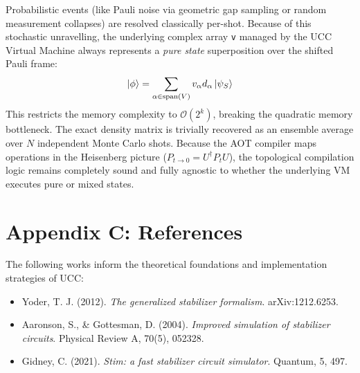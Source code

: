 \documentclass[11pt]{article}
\begin{document}
Probabilistic events (like Pauli noise via geometric gap sampling or random measurement collapses) are resolved classically per-shot. Because of this stochastic unravelling, the underlying complex array \texttt{v} managed by the UCC Virtual Machine always represents a \textit{pure state} superposition over the shifted Pauli frame:
\begin{equation}
    \ket{\phi} = \sum_{\alpha \in \text{span}(V)} v_\alpha d_\alpha \ket{\psi_S}
\end{equation}
This restricts the memory complexity to $\mathcal{O}(2^k)$, breaking the quadratic memory bottleneck. The exact density matrix is trivially recovered as an ensemble average over $N$ independent Monte Carlo shots. Because the AOT compiler maps operations in the Heisenberg picture ($P_{t \to 0} = U^\dagger P_t U$), the topological compilation logic remains completely sound and fully agnostic to whether the underlying VM executes pure or mixed states.

\newpage
\section{Appendix C: References}
\label{app:references}

The following works inform the theoretical foundations and implementation strategies of UCC:

\begin{itemize}
    \item Yoder, T. J. (2012). \textit{The generalized stabilizer formalism}. arXiv:1212.6253.
    \item Aaronson, S., \& Gottesman, D. (2004). \textit{Improved simulation of stabilizer circuits}. Physical Review A, 70(5), 052328.
    \item Gidney, C. (2021). \textit{Stim: a fast stabilizer circuit simulator}. Quantum, 5, 497.
\end{itemize}
\end{document}
